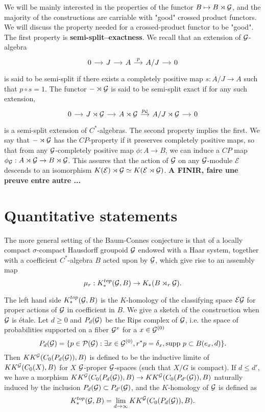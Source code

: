 We will be mainly interested in the properties of the functor $B\mapsto B\rtimes \mathcal G$, and the majority of the constructions are carriable with "good" crossed product functors. We will discuss the property needed for a crossed-product functor to be "good".\\  
The first property is \textbf{semi-split--exactness}. We recall that an extension of $\mathcal G$-algebra \[\begin{tikzcd}[column sep = small]0\arrow{r} & J \arrow{r} & A\arrow{r}{p} & A/J \arrow{r} & 0\end{tikzcd}\] is said to be semi-split if there exists a completely positive map $s : A/J \rightarrow A$ such that $p\circ s = 1$. The functor $-\rtimes \mathcal G$ is said to be semi-split exact if for any such extension, \[\begin{tikzcd}[column sep = small]0\arrow{r} & J\rtimes \G \arrow{r} & A\rtimes \G\arrow{r}{p_\G} & A/J\rtimes \G \arrow{r} & 0\end{tikzcd}\] is a semi-split extension of $C^*$-algebras.
The second property implies the first. We say that $-\rtimes \mathcal G$ has the $CP$-property if it preserves completely positive maps, so that from any $\mathcal G$-completely positive map $\phi: A\rightarrow B$, we can induce a $CP$ map $\phi_\mathcal G: A\rtimes\mathcal G\rightarrow B\rtimes \mathcal G$. This assures that the action of $\mathcal G$ on any $\mathcal G$-module $\mathcal E$ descends to an isomorphism $K(\mathcal E)\rtimes \mathcal G \simeq K(\mathcal E\rtimes \mathcal G)$.
 \textbf{A FINIR, faire une preuve entre autre ...}
  

\section{Quantitative statements}

The more general setting of the Baum-Connes conjecture \cite{TuBC} is that of a locally compact $\sigma$-compact Hausdorff groupoid $\mathcal G$ endowed with a Haar system, together with a coefficient $C^*$-algebra $B$ acted upon by $\mathcal G$, which give rise to an assembly map
\[\mu_r : K^{top}_*(\mathcal G,B)\rightarrow K_*(B\rtimes_r \mathcal G).\]

The left hand side $K^{top}_*(\mathcal G,B)$ is the $K$-homology of the classifying space $\mathcal E \mathcal G$ for proper actions of $\mathcal G$ in coefficient in $B$. We give a sketch of the construction when $\mathcal G$ is étale. Let $d\geq 0$ and $P_d(\mathcal G)$ be the Rips complex of $\mathcal G$, i.e. the space of probabilities supported on a fiber $\mathcal G^x$ for a $x\in \mathcal G^{(0)}$
\[P_d(\mathcal G) = \{p\in \mathcal P(\mathcal G) : \exists x\in \mathcal G^{(0)}, r^*p=\delta_x, \text{supp }p \subset B(e_x,d)\}.\]
Then $KK^\mathcal G( C_0(P_d(\mathcal G)),B)$ is defined to be the inductive limite of $KK^\mathcal G( C_0(X),B)$ for $X$ $\mathcal G$-proper $\mathcal G$-spaces (such that $X/G$ is compact). If $d\leq d'$, we have a morphism $KK^\mathcal G( C_0(P_d(\mathcal G)),B)\rightarrow KK^\mathcal G( C_0(P_{d'}(\mathcal G)),B)$ naturally induced by the inclusion $P_d(\mathcal G)\subset P_{d'}(\mathcal G)$, and the $K$-homology of $\mathcal G$ is defined as
\[K^{top}_*(\mathcal G,B)=\lim_{d\rightarrow \infty} KK^\mathcal G( C_0(P_d(\mathcal G)),B).\]

